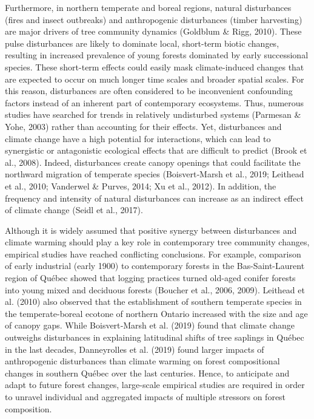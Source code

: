 \documentclass[
  a4paperpaper,
]{article}
\begin{document}
Furthermore, in northern temperate and boreal regions, natural
disturbances (fires and insect outbreaks) and anthropogenic disturbances
(timber harvesting) are major drivers of tree community dynamics
(Goldblum \& Rigg, 2010). These pulse disturbances are likely to
dominate local, short-term biotic changes, resulting in increased
prevalence of young forests dominated by early successional species.
These short-term effects could easily mask climate-induced changes that
are expected to occur on much longer time scales and broader spatial
scales. For this reason, disturbances are often considered to be
inconvenient confounding factors instead of an inherent part of
contemporary ecosystems. Thus, numerous studies have searched for trends
in relatively undisturbed systems (Parmesan \& Yohe, 2003) rather than
accounting for their effects. Yet, disturbances and climate change have
a high potential for interactions, which can lead to synergistic or
antagonistic ecological effects that are difficult to predict (Brook et
al., 2008). Indeed, disturbances create canopy openings that could
facilitate the northward migration of temperate species (Boisvert‐Marsh
et al., 2019; Leithead et al., 2010; Vanderwel \& Purves, 2014; Xu et
al., 2012). In addition, the frequency and intensity of natural
disturbances can increase as an indirect effect of climate change (Seidl
et al., 2017).

Although it is widely assumed that positive synergy between disturbances
and climate warming should play a key role in contemporary tree
community changes, empirical studies have reached conflicting
conclusions. For example, comparison of early industrial (early 1900) to
contemporary forests in the Bas-Saint-Laurent region of Québec showed
that logging practices turned old-aged conifer forests into young mixed
and deciduous forests (Boucher et al., 2006, 2009). Leithead et al.
(2010) also observed that the establishment of southern temperate
species in the temperate-boreal ecotone of northern Ontario increased
with the size and age of canopy gaps. While Boisvert‐Marsh et al. (2019)
found that climate change outweighs disturbances in explaining
latitudinal shifts of tree saplings in Québec in the last decades,
Danneyrolles et al. (2019) found larger impacts of anthropogenic
disturbances than climate warming on forest compositional changes in
southern Québec over the last centuries. Hence, to anticipate and adapt
to future forest changes, large-scale empirical studies are required in
order to unravel individual and aggregated impacts of multiple stressors
on forest composition.
\end{document}
